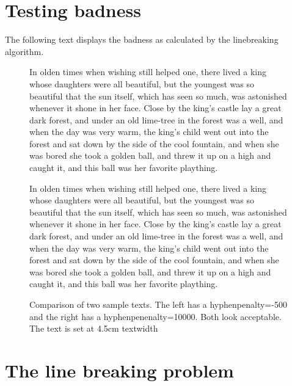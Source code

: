 {{{\section{Testing badness}
The following text displays the badness as calculated by the linebreaking algorithm.
\begin{figure*}[htb]
\fussy
{} 
\begin{minipage}[t]{4.5cm}
\mbox{}
\trypar{}
In olden times when wishing
still helped one, there lived a
king whose daughters were all
beautiful, but the youngest was so
beautiful that the sun itself,
which has seen so much, was
astonished whenever it shone in
her face. Close by the king's
castle lay a great dark forest,
and under an old lime-tree in the
forest was a well, and when
the day was very warm, the
king's child went out into the 
forest and sat down by the side
of the cool fountain, and when she was bored she
took a golden ball, and threw it up on a high and caught it, and this
ball was her favorite plaything. \par
\end{minipage}
\hspace{2cm}
\begin{minipage}[t]{4.5cm}
\mbox{}
\trypar{}
In olden times when wishing
still helped one, there lived a
king whose daughters were all
beautiful, but the youngest was so
beautiful that the sun itself,
which has seen so much, was
astonished whenever it shone in
her face. Close by the king's
castle lay a great dark forest,
and under an old lime-tree in the
forest was a well, and when
the day was very warm, the
king's child went out into the 
forest and sat down by the side
of the cool fountain, and when she was bored she
took a golden ball, and threw it up on a high and caught it, and this
ball was her favorite plaything. \par
\end{minipage}
\caption{Comparison of two sample texts. The left has a hyphenpenalty=-500 and the right has a hyphenpenenalty=10000. Both look acceptable. The text is set at 4.5cm textwidth}
\end{figure*}

\lorem

\lorem

\lorem


\section{The line breaking problem}

}}}
